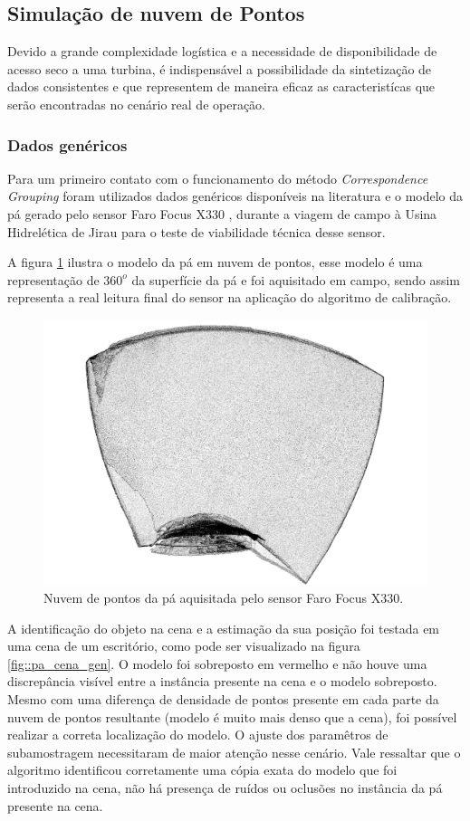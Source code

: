\subsection{Simulação de nuvem de Pontos}

Devido a grande complexidade logística e a necessidade de disponibilidade de
acesso seco a uma turbina, é indispensável a possibilidade da sintetização de
dados consistentes e que representem de maneira eficaz as caracteristícas que
serão encontradas no cenário real de operação. 

\subsubsection{Dados genéricos}

Para um primeiro contato com o funcionamento do método \textit{Correspondence
Grouping} foram utilizados dados genéricos disponíveis na
literatura\footnotemark {} e o modelo da pá gerado pelo sensor Faro Focus X330 , durante a viagem de campo
à Usina Hidrelética de Jirau para o teste de viabilidade técnica desse sensor.


A figura \ref{fig::modelo_pa_faro} ilustra o modelo da pá em nuvem de pontos,
esse modelo é uma representação de $360^o$ da superfície da pá e foi aquisitado em
campo, sendo assim representa a real leitura final do sensor na aplicação do
algoritmo de calibração.

\begin{figure}[h!]
	\centering
	\includegraphics[width=0.7\columnwidth]{method/figs/calibracao/modelo_pa_faro}
	\caption{Nuvem de pontos da pá aquisitada pelo sensor Faro Focus X330.}
    \label{fig::modelo_pa_faro}
\end{figure}

A identificação do objeto na cena e a estimação da sua posição foi testada em
uma cena de um escritório, como pode ser visualizado na figura
\ref{fig::pa_cena_gen}. O modelo foi sobreposto em vermelho e não houve uma
discrepância visível entre a instância presente na cena e o modelo sobreposto. 
Mesmo com uma diferença de densidade de pontos presente em cada parte da nuvem
de pontos resultante (modelo é muito mais denso que a cena), foi possível
realizar a correta localização do modelo. O ajuste dos paramêtros de
subamostragem necessitaram de maior atenção nesse cenário. Vale ressaltar que o
algoritmo identificou corretamente uma cópia exata do modelo que foi introduzido
na cena, não há presença de ruídos ou oclusões no instância da pá presente na
cena.

